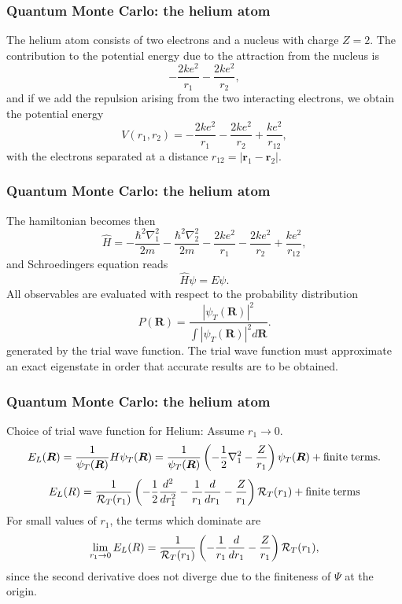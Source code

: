 \documentclass{beamer}
\begin{document}
\begin{frame}
\frametitle{Quantum Monte Carlo: the helium atom}

\begin{block}{}
The helium atom consists of two electrons and a nucleus with
charge $Z=2$. 
The contribution  
to the potential energy due to the attraction from the nucleus is
\[
   -\frac{2ke^2}{r_1}-\frac{2ke^2}{r_2},
\] 
and if we add the repulsion arising from the two 
interacting electrons, we obtain the potential energy
\[
 V(r_1, r_2)=-\frac{2ke^2}{r_1}-\frac{2ke^2}{r_2}+
               \frac{ke^2}{r_{12}},
\]
with the electrons separated at a distance 
$r_{12}=|\bm{r}_1-\bm{r}_2|$.
\end{block}
\end{frame}

\begin{frame}
\frametitle{Quantum Monte Carlo: the helium atom}

\begin{block}{}

The hamiltonian becomes then
\[
   \hat{H}=-\frac{\hbar^2\nabla_1^2}{2m}-\frac{\hbar^2\nabla_2^2}{2m}
          -\frac{2ke^2}{r_1}-\frac{2ke^2}{r_2}+
               \frac{ke^2}{r_{12}},
\]
and  Schroedingers equation reads
\[
   \hat{H}\psi=E\psi.
\]
All observables are evaluated with respect to the probability distribution
\[
   P(\bm{R})= \frac{\left|\psi_T(\bm{R})\right|^2}{\int \left|\psi_T(\bm{R})\right|^2d\bm{R}}.
\]
generated by the trial wave function.   
The trial wave function must approximate an exact 
eigenstate in order that accurate results are to be obtained. 
\end{block}
\end{frame}

\begin{frame}
\frametitle{Quantum Monte Carlo: the helium atom}

\begin{block}{}
Choice of trial wave function for Helium:
Assume $r_1 \rightarrow 0$.
\[
   E_L(\bm{R})=\frac{1}{\psi_T(\bm{R})}H\psi_T(\bm{R})=
     \frac{1}{\psi_T(\bm{R})}\left(-\frac{1}{2}\nabla^2_1
     -\frac{Z}{r_1}\right)\psi_T(\bm{R}) + \mathrm{finite \hspace{0.1cm}terms}.
\]
\[ 
    E_L(R)=
    \frac{1}{{\cal R}_T(r_1)}\left(-\frac{1}{2}\frac{d^2}{dr_1^2}-
     \frac{1}{r_1}\frac{d}{dr_1}
     -\frac{Z}{r_1}\right){\cal R}_T(r_1) + \mathrm{finite\hspace{0.1cm} terms}
\]
For small values of $r_1$, the terms which dominate are
\[ 
    \lim_{r_1 \rightarrow 0}E_L(R)=
    \frac{1}{{\cal R}_T(r_1)}\left(-
     \frac{1}{r_1}\frac{d}{dr_1}
     -\frac{Z}{r_1}\right){\cal R}_T(r_1),
\]
since the second derivative does not diverge due to the finiteness of  $\Psi$ at the origin.
\end{block}
\end{frame}
\end{document}
